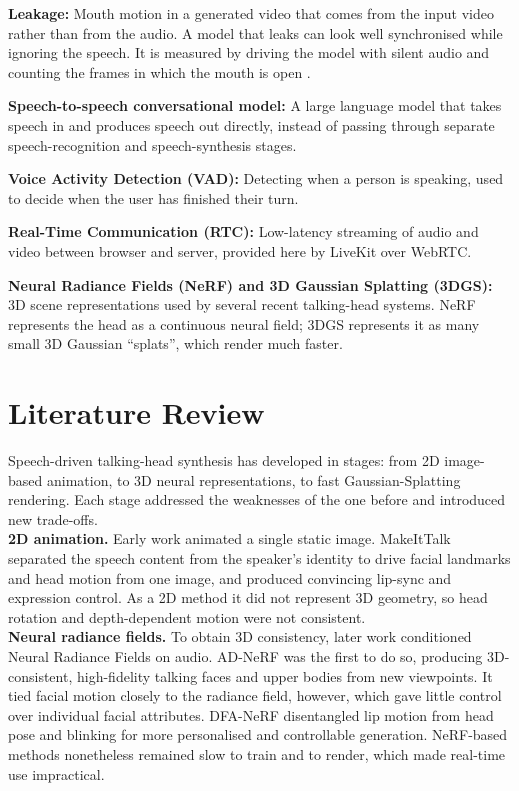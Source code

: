 \noindent
\textbf{Leakage:} Mouth motion in a generated video that comes from the input video rather than from the audio. A model that leaks can look well synchronised while ignoring the speech. It is measured by driving the model with silent audio and counting the frames in which the mouth is open \cite{bigata2025keysync}.

\noindent
\textbf{Speech-to-speech conversational model:} A large language model that takes speech in and produces speech out directly, instead of passing through separate speech-recognition and speech-synthesis stages.

\noindent
\textbf{Voice Activity Detection (VAD):} Detecting when a person is speaking, used to decide when the user has finished their turn.

\noindent
\textbf{Real-Time Communication (RTC):} Low-latency streaming of audio and video between browser and server, provided here by LiveKit over WebRTC.

\noindent
\textbf{Neural Radiance Fields (NeRF) and 3D Gaussian Splatting (3DGS):} 3D scene representations used by several recent talking-head systems. NeRF represents the head as a continuous neural field; 3DGS represents it as many small 3D Gaussian ``splats'', which render much faster.


\section{Literature Review}

Speech-driven talking-head synthesis has developed in stages: from 2D image-based animation, to 3D neural representations, to fast Gaussian-Splatting rendering. Each stage addressed the weaknesses of the one before and introduced new trade-offs.\\

\noindent
\textbf{2D animation.} Early work animated a single static image. MakeItTalk \cite{DBLP:journals/corr/abs-2004-12992} separated the speech content from the speaker's identity to drive facial landmarks and head motion from one image, and produced convincing lip-sync and expression control. As a 2D method it did not represent 3D geometry, so head rotation and depth-dependent motion were not consistent.\\

\noindent
\textbf{Neural radiance fields.} To obtain 3D consistency, later work conditioned Neural Radiance Fields on audio. AD-NeRF \cite{DBLP:journals/corr/abs-2103-11078} was the first to do so, producing 3D-consistent, high-fidelity talking faces and upper bodies from new viewpoints. It tied facial motion closely to the radiance field, however, which gave little control over individual facial attributes. DFA-NeRF \cite{DBLP:journals/corr/abs-2201-00791} disentangled lip motion from head pose and blinking for more personalised and controllable generation. NeRF-based methods nonetheless remained slow to train and to render, which made real-time use impractical.\\


